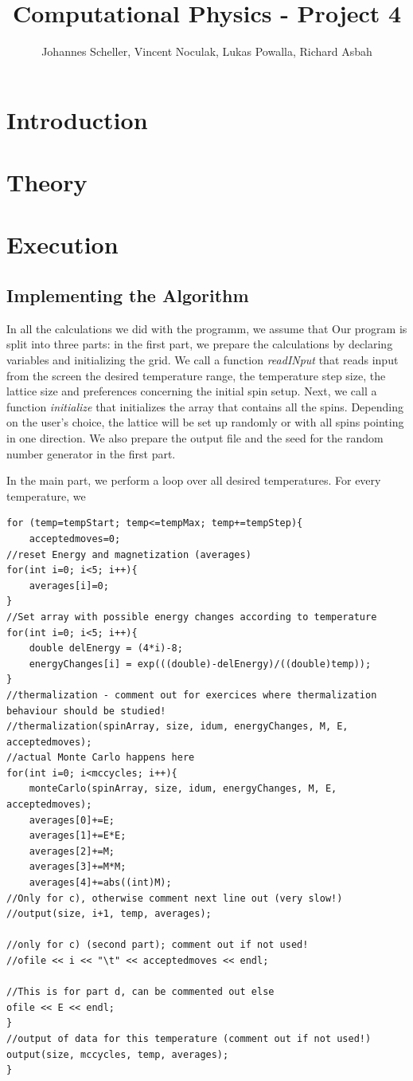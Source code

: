 \documentclass[10pt,a4paper]{article}
\author{Johannes Scheller, Vincent Noculak, Lukas Powalla, Richard Asbah}
\title{Computational Physics - Project 4}
\begin{document}
\maketitle
\newpage
\tableofcontents
\newpage

\section*{Introduction}

\section{Theory}

\section{Execution}
\subsection{Implementing the Algorithm}
In all the calculations we did with the programm, we assume that 
Our program is split into three parts: in the first part, we prepare the calculations by declaring variables and initializing the grid. We call a function \emph{readINput} that reads input from the screen the desired temperature range, the temperature step size, the lattice size and preferences concerning the initial spin setup. Next, we call a function \emph{initialize} that initializes the array that contains all the spins. Depending on the user's choice, the lattice will be set up randomly or with all spins pointing in one direction. We also prepare the output file and the seed for the random number generator in the first part.

In the main part, we perform a loop over all desired temperatures. For every temperature, we 

\begin{lstlisting}
for (temp=tempStart; temp<=tempMax; temp+=tempStep){
	acceptedmoves=0;
//reset Energy and magnetization (averages)
for(int i=0; i<5; i++){
	averages[i]=0;
}
//Set array with possible energy changes according to temperature
for(int i=0; i<5; i++){
	double delEnergy = (4*i)-8;
	energyChanges[i] = exp(((double)-delEnergy)/((double)temp));
}
//thermalization - comment out for exercices where thermalization behaviour should be studied!
//thermalization(spinArray, size, idum, energyChanges, M, E, acceptedmoves);
//actual Monte Carlo happens here
for(int i=0; i<mccycles; i++){
	monteCarlo(spinArray, size, idum, energyChanges, M, E, acceptedmoves);
	averages[0]+=E;
	averages[1]+=E*E;
	averages[2]+=M;
	averages[3]+=M*M;
	averages[4]+=abs((int)M);
//Only for c), otherwise comment next line out (very slow!)
//output(size, i+1, temp, averages);

//only for c) (second part); comment out if not used!
//ofile << i << "\t" << acceptedmoves << endl;

//This is for part d, can be commented out else
ofile << E << endl;
}
//output of data for this temperature (comment out if not used!)
output(size, mccycles, temp, averages);
}
\end{lstlisting}
\end{document}
